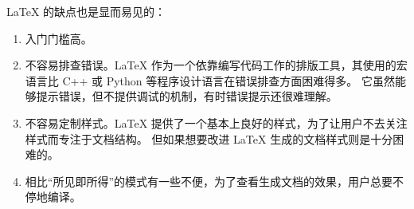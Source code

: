 \LaTeX{} 的缺点也是显而易见的：

\begin{enumerate}
\item 入门门槛高。
\item 不容易排查错误。\LaTeX{} 作为一个依靠编写代码工作的排版工具，其使用的宏语言比 C++ 或 Python 等程序设计语言在错误排查方面困难得多。
它虽然能够提示错误，但不提供调试的机制，有时错误提示还很难理解。
\item 不容易定制样式。\LaTeX{} 提供了一个基本上良好的样式，为了让用户不去关注样式而专注于文档结构。
但如果想要改进 \LaTeX{} 生成的文档样式则是十分困难的。
\item 相比“所见即所得”的模式有一些不便，为了查看生成文档的效果，用户总要不停地编译。
\end{enumerate}
